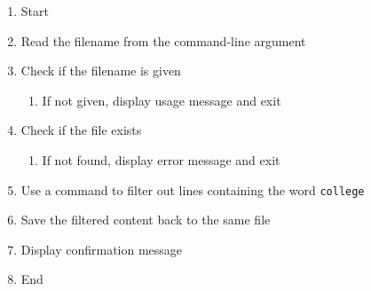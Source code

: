 \begin{enumerate}
    \item Start
    \item Read the filename from the command-line argument
    \item Check if the filename is given
    \begin{enumerate}
        \item If not given, display usage message and exit
    \end{enumerate}
    \item Check if the file exists
    \begin{enumerate}
        \item If not found, display error message and exit
    \end{enumerate}
    \item Use a command to filter out lines containing the word \texttt{college}
    \item Save the filtered content back to the same file
    \item Display confirmation message
    \item End
\end{enumerate}
